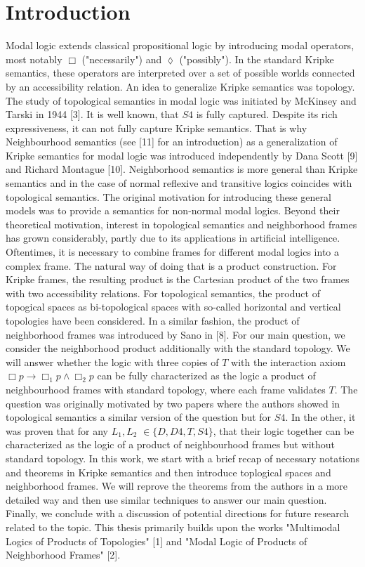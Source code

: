 \documentclass[12pt, a4paper]{scrartcl}
\begin{document}
\section{Introduction}
Modal logic extends classical propositional logic by introducing modal operators, most notably $\Box$ ("necessarily") and $\lozenge$ ("possibly"). In the standard Kripke semantics, 
these operators are interpreted over a set of possible worlds connected by an accessibility relation. An idea to generalize Kripke semantics was topology.
The study of topological semantics in modal logic was initiated by McKinsey and Tarski in 1944 [3]. It is well known, that $S4$ is fully captured. Despite its rich expressiveness,
it can not fully capture Kripke semantics. That is why Neighbourhood semantics (see [11] for an introduction) as a generalization of Kripke semantics for modal logic was introduced independently by Dana Scott [9] and Richard Montague [10].
Neighborhood semantics is more general than Kripke semantics and in the case of normal reflexive and transitive logics coincides with topological semantics.
The original motivation for introducing these general models was to provide a semantics for non-normal modal logics. 
Beyond their theoretical motivation, interest in topological semantics and neighborhood frames has grown considerably, partly due to its applications in artificial intelligence. \newline
Oftentimes, it is necessary to combine frames for different modal logics into a complex
frame. The natural way of doing that is a product construction. For Kripke frames,
the resulting product is the Cartesian product of the two frames with two accessibility
relations. For topological semantics, the product of topogical spaces as bi-topological
spaces with so-called horizontal and vertical topologies have been considered. In a similar
fashion, the product of neighborhood frames was introduced by Sano in [8]. \newline
For our main question, we consider the neighborhood product additionally with the standard topology. We will answer whether 
the logic with three copies of $T$ with the interaction axiom $\Box p \rightarrow \Box_1 p \land \Box_2 p$ can be fully characterized as the logic a product of neighbourhood frames with standard topology, where each frame validates $T$.
The question was originally motivated by two papers where the authors showed in topological semantics a similar version of the question but for $S4$. In the other, it was proven that for any $L_1, L_2$ $\in \{D,D4,T,S4\}$, that their logic together 
can be characterized as the logic of a product of neighbourhood frames but without standard topology. In this work, we start with a brief recap of necessary notations and theorems in Kripke semantics and then introduce toplogical spaces and neighborhood frames. 
We will reprove the theorems from the authors in a more detailed way and then use similar techniques to answer our main question.
Finally, we conclude with a discussion of potential directions for future research related to the topic. 
This thesis primarily builds upon the works "Multimodal Logics of Products of Topologies" [1] and "Modal Logic of Products of Neighborhood Frames" [2].
\end{document}
